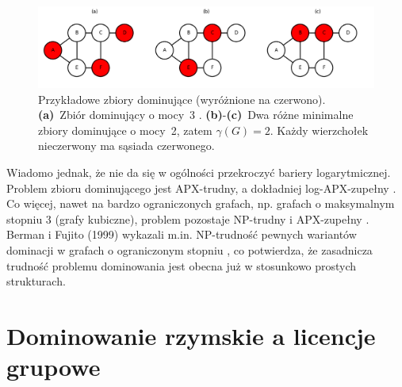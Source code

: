 \begin{figure}[H]
  \centering
  \includegraphics[width=1\textwidth]{assets/dominating-set-example.png}
  \caption[Przykładowe zbiory dominujące]{%
    Przykładowe zbiory dominujące (wyróżnione na czerwono).
    \textbf{(a)}~Zbiór dominujący o mocy~3 .
    \textbf{(b)}-\textbf{(c)}~Dwa różne minimalne zbiory dominujące o mocy~2, zatem
    \(\gamma(G)=2\).  Każdy wierzchołek nieczerwony ma sąsiada czerwonego.
  }
  \label{fig:dominatingexample}
\end{figure}

 \newpage
 Wiadomo jednak, że nie da się w ogólności przekroczyć bariery logarytmicznej. Problem zbioru dominującego jest APX-trudny, a dokładniej log-APX-zupełny \cite{POUREIDI2023106363}. Co więcej, nawet na bardzo ograniczonych grafach, np. grafach o maksymalnym stopniu 3 (grafy kubiczne), problem pozostaje NP-trudny i APX-zupełny \cite{ALIMONTI2000123}. Berman i Fujito (1999) wykazali m.in. NP-trudność pewnych wariantów dominacji w grafach o ograniczonym stopniu \cite{BermanFujitoThreeDegree}, co potwierdza, że zasadnicza trudność problemu dominowania jest obecna już w stosunkowo prostych strukturach.


\section{Dominowanie rzymskie a licencje grupowe}

